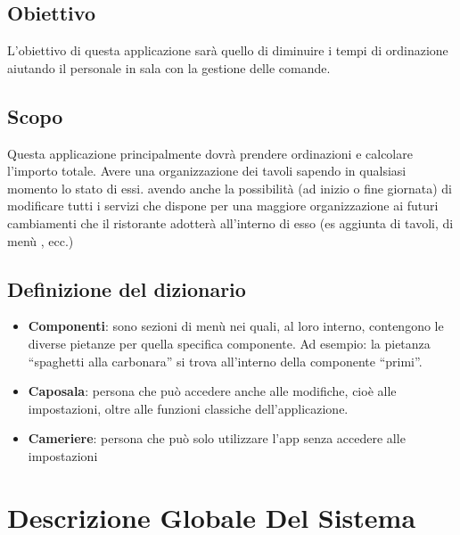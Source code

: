 \documentclass[12pt, letterpaper]{book}
\begin{document}
\subsection{Obiettivo}
L'obiettivo di questa applicazione sarà quello di diminuire i tempi di ordinazione aiutando  il personale in sala con la gestione delle comande.
\subsection{Scopo}
Questa applicazione principalmente dovrà prendere ordinazioni e calcolare l'importo totale. Avere una organizzazione dei tavoli sapendo in qualsiasi momento lo stato di essi. avendo anche la possibilità (ad inizio o fine giornata) di modificare tutti i servizi che dispone per una maggiore organizzazione ai futuri cambiamenti che il ristorante adotterà all'interno di esso (es aggiunta di tavoli, di menù , ecc.)
\subsection{Definizione del dizionario}
\begin{itemize}
    \item \textbf{Componenti}: sono sezioni di menù nei quali, al loro interno, contengono le diverse pietanze per quella specifica componente. Ad esempio: la pietanza “spaghetti alla carbonara” si trova all'interno della componente “primi”.
    \item \textbf{Caposala}: persona che può accedere anche alle modifiche, cioè alle impostazioni, oltre alle funzioni classiche dell'applicazione.
    \item \textbf{Cameriere}: persona che può solo utilizzare l'app senza accedere alle impostazioni
\end{itemize}
\section{Descrizione Globale Del Sistema}
\end{document}
